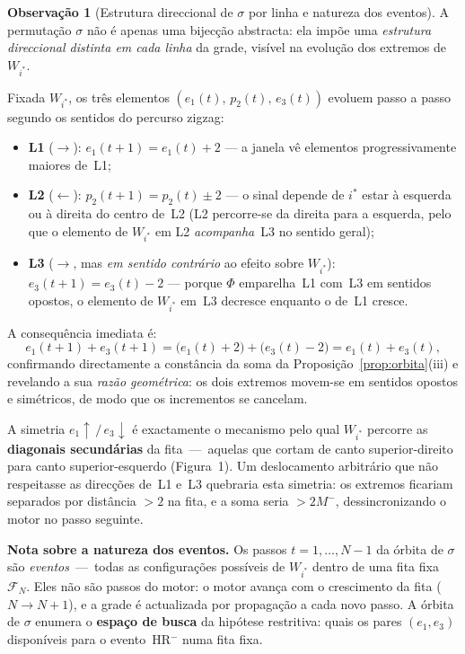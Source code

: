 \documentclass[12pt, a4paper]{article}
\theoremstyle{plain}
\theoremstyle{definition}
\newtheorem{remark}[theorem]{Observação}
\theoremstyle{remark}
\begin{document}
	\begin{remark}[Estrutura direccional de $\sigma$ por linha e natureza dos eventos]
		\label{rem:sigma-direcoes}
		A permutação $\sigma$ não é apenas uma bijecção abstracta: ela
		impõe uma \emph{estrutura direccional distinta em cada linha}
		da grade, visível na evolução dos extremos de $W_{i^*}$.
		
		Fixada $W_{i^*}$, os três elementos $(e_1(t),\,p_2(t),\,e_3(t))$
		evoluem passo a passo segundo os sentidos do percurso zigzag:
		\begin{itemize}
			\item \textbf{L1} ($\rightarrow$):
			$e_1(t{+}1)=e_1(t)+2$
			--- a janela vê elementos progressivamente maiores de~L1;
			\item \textbf{L2} ($\leftarrow$):
			$p_2(t{+}1)=p_2(t)\pm2$
			--- o sinal depende de $i^*$ estar à esquerda ou à direita
			do centro de~L2 (L2 percorre-se da direita para a esquerda,
			pelo que o elemento de $W_{i^*}$ em L2 \emph{acompanha}~L3
			no sentido geral);
			\item \textbf{L3} ($\rightarrow$, mas \emph{em sentido contrário}
			ao efeito sobre $W_{i^*}$):
			$e_3(t{+}1)=e_3(t)-2$
			--- porque $\Phi$ emparelha~L1 com~L3 em sentidos opostos,
			o elemento de $W_{i^*}$ em~L3 decresce enquanto o de~L1
			cresce.
		\end{itemize}
		A consequência imediata é:
		\[
		e_1(t{+}1)+e_3(t{+}1)
		=\bigl(e_1(t)+2\bigr)+\bigl(e_3(t)-2\bigr)
		=e_1(t)+e_3(t),
		\]
		confirmando directamente a constância da soma da
		Proposição~\ref{prop:orbita}(iii) e revelando a sua
		\emph{razão geométrica}: os dois extremos movem-se em sentidos
		opostos e simétricos, de modo que os incrementos se cancelam.
		
		A simetria $e_1\!\uparrow\,/\,e_3\!\downarrow$ é exactamente o
		mecanismo pelo qual $W_{i^*}$ percorre as \textbf{diagonais
			secundárias} da fita~---~aquelas que cortam de canto
		superior-direito para canto superior-esquerdo (Figura~1).  Um
		deslocamento arbitrário que não respeitasse as direcções de~L1
		e~L3 quebraria esta simetria: os extremos ficariam separados por
		distância $>2$ na fita, e a soma seria $>2M^-$,
		dessincronizando o motor no passo seguinte.
		
		\medskip
		\noindent\textbf{Nota sobre a natureza dos eventos.}
		Os passos $t=1,\ldots,N-1$ da órbita de $\sigma$ são
		\emph{eventos}~---~todas as configurações possíveis de $W_{i^*}$
		dentro de uma fita fixa $\mathcal{F}_N$.  Eles não são passos
		do motor: o motor avança com o crescimento da fita
		($N\to N{+}1$), e a grade é actualizada por propagação a cada
		novo passo.  A órbita de $\sigma$ enumera o
		\textbf{espaço de busca} da hipótese restritiva: quais os pares
		$(e_1,e_3)$ disponíveis para o evento~HR$^-$ numa fita fixa.
	\end{remark}
	
\end{document}
